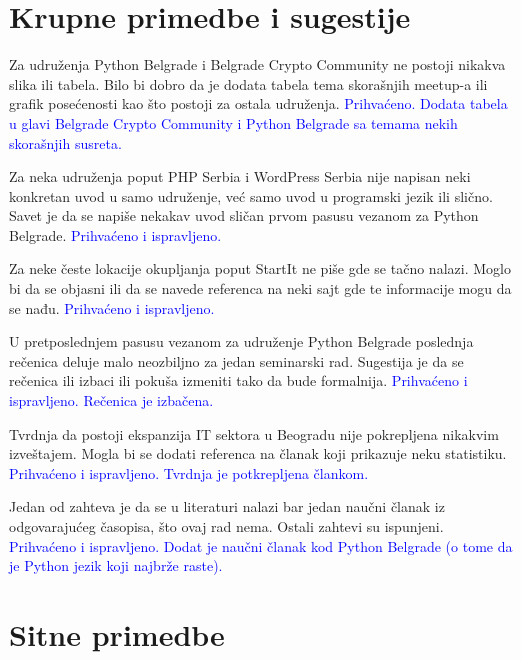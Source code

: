 \documentclass[a4paper]{report}
\newcommand{\odgovor}[1]{\textcolor{blue}{#1}}
\begin{document}
\section{Krupne primedbe i sugestije}

Za udruženja Python Belgrade i Belgrade Crypto Community ne postoji nikakva slika ili tabela. Bilo bi dobro da je dodata tabela tema skorašnjih meetup-a ili grafik posećenosti kao što postoji za ostala udruženja.
\odgovor{Prihvaćeno. Dodata tabela u glavi Belgrade Crypto Community i Python Belgrade sa temama nekih skorašnjih susreta.}

Za neka udruženja poput PHP Serbia i WordPress Serbia nije napisan neki konkretan uvod u samo udruženje, već samo uvod u programski jezik ili slično. Savet je da se napiše nekakav uvod sličan prvom pasusu vezanom za Python Belgrade. 
\odgovor{Prihvaćeno i ispravljeno.}

Za neke česte lokacije okupljanja poput StartIt ne piše gde se tačno nalazi. Moglo bi da se objasni ili da se navede referenca na neki sajt gde te informacije mogu da se nađu. \odgovor{Prihvaćeno i ispravljeno.}

U pretposlednjem pasusu vezanom za udruženje Python Belgrade poslednja rečenica deluje malo neozbiljno za jedan seminarski rad. Sugestija je da se rečenica ili izbaci ili pokuša izmeniti tako da bude formalnija. \odgovor{Prihvaćeno i ispravljeno. Rečenica je izbačena.}

Tvrdnja da postoji ekspanzija IT sektora u Beogradu nije pokrepljena nikakvim izveštajem. Mogla bi se dodati referenca na članak koji prikazuje neku statistiku.
\odgovor{Prihvaćeno i ispravljeno. Tvrdnja je potkrepljena člankom.}

Jedan od zahteva je da se u literaturi nalazi bar jedan naučni članak iz odgovarajućeg časopisa, što ovaj rad nema. Ostali zahtevi su ispunjeni.
\odgovor{Prihvaćeno i ispravljeno. Dodat je naučni članak kod Python Belgrade (o tome da je Python jezik koji najbrže raste).}

\section{Sitne primedbe}
\end{document}
